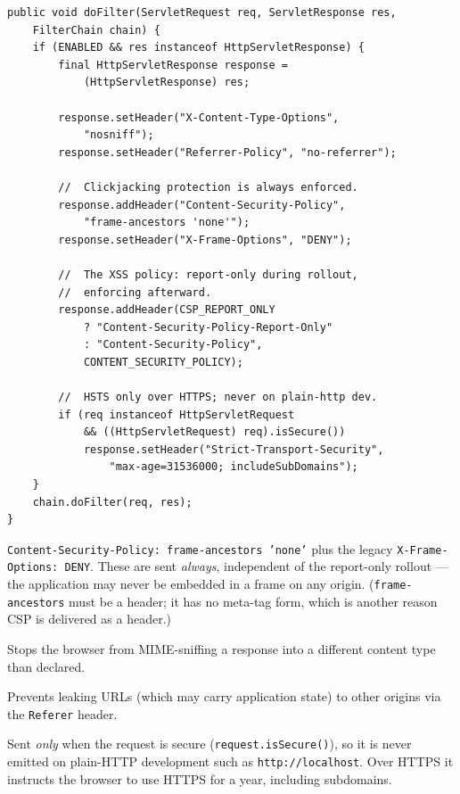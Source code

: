 \begin{lstlisting}[style=java]
public void doFilter(ServletRequest req, ServletResponse res,
    FilterChain chain) {
    if (ENABLED && res instanceof HttpServletResponse) {
        final HttpServletResponse response =
            (HttpServletResponse) res;

        response.setHeader("X-Content-Type-Options",
            "nosniff");
        response.setHeader("Referrer-Policy", "no-referrer");

        //  Clickjacking protection is always enforced.
        response.addHeader("Content-Security-Policy",
            "frame-ancestors 'none'");
        response.setHeader("X-Frame-Options", "DENY");

        //  The XSS policy: report-only during rollout,
        //  enforcing afterward.
        response.addHeader(CSP_REPORT_ONLY
            ? "Content-Security-Policy-Report-Only"
            : "Content-Security-Policy",
            CONTENT_SECURITY_POLICY);

        //  HSTS only over HTTPS; never on plain-http dev.
        if (req instanceof HttpServletRequest
            && ((HttpServletRequest) req).isSecure())
            response.setHeader("Strict-Transport-Security",
                "max-age=31536000; includeSubDomains");
    }
    chain.doFilter(req, res);
}
\end{lstlisting}

\begin{description}[style=nextline]
  \item[Clickjacking protection] \texttt{Content-Security-Policy: frame-ancestors 'none'} plus the legacy \texttt{X-Frame-Options: DENY}.  These are sent \emph{always}, independent of the report-only rollout --- the application may never be embedded in a frame on any origin.  (\texttt{frame-ancestors} must be a header; it has no meta-tag form, which is another reason CSP is delivered as a header.)
  \item[\texttt{X-Content-Type-Options: nosniff}] Stops the browser from MIME-sniffing a response into a different content type than declared.
  \item[\texttt{Referrer-Policy: no-referrer}] Prevents leaking URLs (which may carry application state) to other origins via the \texttt{Referer} header.
  \item[\texttt{Strict-Transport-Security}] Sent \emph{only} when the request is secure (\texttt{request.isSecure()}), so it is never emitted on plain-HTTP development such as \texttt{http://localhost}.  Over HTTPS it instructs the browser to use HTTPS for a year, including subdomains.
\end{description}

